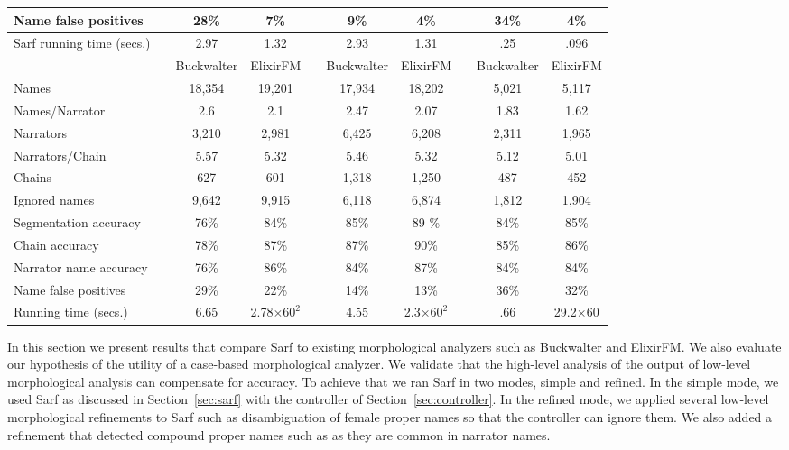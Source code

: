 \documentclass[11pt]{article}
\begin{document}
\begin{table*}[bt]
{\begin{tabular}{lp{.2cm}ccp{.2cm}ccp{.2cm}cc}
Name false positives & & 28\% & 7\%&  & 9\%& 4\% & & 34\% & 4\% \\ \hline
Sarf running time (secs.)& & 2.97 & 1.32 & & 2.93 & 1.31 & & .25 & .096\\ \hline \hline
 & & Buckwalter& ElixirFM & & Buckwalter & ElixirFM & & Buckwalter & ElixirFM \\\bottomrule
Names      & & 18,354 & 19,201 & & 17,934 &  18,202 & & 5,021 & 5,117 \\
Names/Narrator& & 2.6 & 2.1 & & 2.47 &  2.07 & & 1.83 & 1.62\\
Narrators & & 3,210 & 2,981 & & 6,425 &  6,208 & & 2,311 & 1,965 \\ 
Narrators/Chain & & 5.57 & 5.32 & & 5.46 &  5.32 & & 5.12 & 5.01 \\
Chains & & 627 & 601 &  & 1,318 & 1,250 & & 487 & 452 \\ 
Ignored names & & 9,642 & 9,915 &  & 6,118 & 6,874 & & 1,812 & 1,904 \\ \hline
Segmentation accuracy & & 76\%& 84\%& & 85\%& 89 \%& & 84\%& 85\%\\ 
Chain accuracy & & 78\% & 87\%&  & 87\%& 90\%& & 85\% & 86\% \\ 
Narrator name accuracy & & 76\% & 86\%& & 84\%& 87\% & & 84\% & 84\% \\ \hline
Name false positives & & 29\% & 22\%&  & 14\%& 13\% & & 36\% & 32\% \\ \hline
Running time (secs.)& & 6.65 & 2.78$\times60^2$& &4.55 & 2.3$\times60^2$ & & .66 & 29.2$\times$60 
\end{tabular}
}
\normalsize
\label{t:hadithresallresults}
\end{table*}

In this section we present results that compare Sarf to existing 
morphological analyzers such as Buckwalter and ElixirFM. 
We also evaluate our hypothesis of the utility of a case-based 
morphological analyzer.
We validate that the high-level analysis of the output 
of low-level morphological analysis can compensate for accuracy.
To achieve that we ran Sarf in two modes, simple and refined.
In the simple mode, we used Sarf as discussed in 
Section~\ref{sec:sarf} with the 
controller of Section~\ref{sec:controller}.
In the refined mode, we applied several low-level morphological 
refinements to Sarf such as disambiguation of 
female proper names so that the controller can ignore them. 
We also added a refinement that detected compound proper names 
such as  
as they are common in narrator names.
\end{document}
